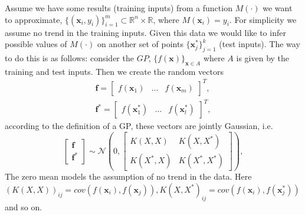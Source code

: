 \documentclass{article}
\newcommand{\x}{\textbf{x}}
\begin{document}
Assume  we have some  results  (training inputs) from a function $M(\cdot)$ we want to approximate,
$\{(\textbf{x}_{i},y_{i})\}_{i=1}^{m}\subset\mathbb{R}^{n}\times\mathbb{R}$, where $M(\textbf{x}_{i})=y_{i}$. For
simplicity we assume no trend in the training inputs. Given this data 
we would like to infer  possible values of $M(\cdot)$ on another set of points 
$\{\textbf{x}_{j}^{*}\}_{j=1}^{k}$ (test inputs). The way to do this is as follows: consider the $GP$, $\{f(\x)\}_{\x\in A}$
where $A$ is given by the training and test inputs. Then we create the random vectors
\begin{eqnarray*}
\textbf{f}=\begin{bmatrix}f(\textbf{x}_{1}) & \ldots & f(\textbf{x}_{m}) \end{bmatrix}^{T}, \\
\textbf{f}^{*}=\begin{bmatrix}f(\textbf{x}_{1}^{*}) & \ldots & f(\textbf{x}_{l}^{*}) \end{bmatrix}^{T},
\end{eqnarray*}
according to the definition of a GP, these vectors are  jointly Gaussian, i.e. 
\begin{equation}\label{eqnconditional}
\begin{bmatrix}
\textbf{f} \\
\textbf{f}^{*}
\end{bmatrix}\sim\mathscr{N}\left(0,\begin{bmatrix} K(X,X) & K(X,X^{*}) \\
						    K(X^{*},X) & K(X^{*},X^{*}) \end{bmatrix}
\right),
\end{equation}	
The zero mean models the assumption of no trend in the data. 
Here
$(K(X,X))_{ij}=cov(f(\x_{i}),f(\x_{j})), K(X,X^{*})_{ij}=cov(f(\textbf{x}_{i}),f(\x_{j}^{*}))$ and so on.
\end{document}
